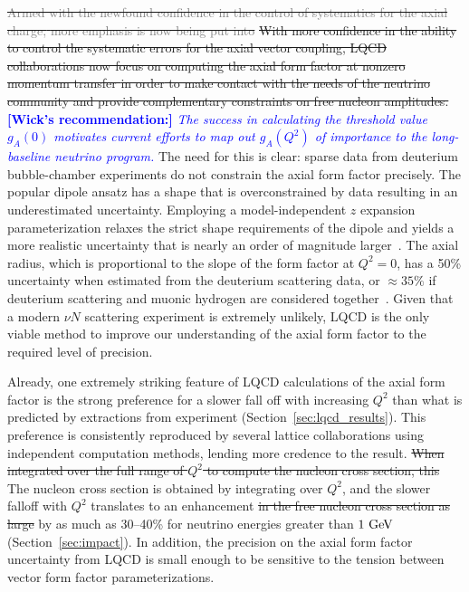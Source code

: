 \documentclass{ar-1col}
\def\asm#1{{\color{blue}#1}}
\def\del#1{}
\def\done#1{{\color{brown}#1}}
\begin{document}
\sout{
 \textcolor{gray}{Armed with the newfound confidence in the control of systematics for the axial charge,}
 \textcolor{gray}{more emphasis is now being put into}}
\sout{
\asm{With more confidence in the ability to control the}
\asm{systematic errors for the axial vector coupling, LQCD collaborations now focus on computing}
 the \done{axial} form factor at nonzero momentum transfer \asm{in order}
 to make contact with the needs of the neutrino community and provide
 complementary constraints on free nucleon amplitudes.
}
{\textcolor{blue}{ {\bf [Wick's recommendation:]}
 \emph{The success in calculating the threshold value $g_A(0)$ motivates current efforts
 to map out $g_A(Q^2)$ of importance to the long-baseline neutrino program.}}}
\asm{The need for this is clear:} \done{sparse data from deuterium bubble-chamber experiments do not constrain
the axial form factor precisely.
The popular dipole ansatz has a shape that
is overconstrained by data resulting in an underestimated uncertainty.
Employing a model-independent $z$ expansion parameterization
relaxes the strict shape requirements of the dipole and yields
a more realistic uncertainty that is nearly an order of magnitude larger~\cite{Meyer:2016oeg}.
The axial radius, which is proportional to the slope of the form factor at $Q^2=0$,
has a 50\% uncertainty when estimated from the deuterium scattering data,
or $\approx35\%$ if deuterium scattering and muonic hydrogen are considered
together~\cite{Hill:2017wgb}.
Given that a modern $\nu N$ scattering experiment is extremely unlikely, LQCD is the only viable method to improve our understanding of the axial form factor to the required level of precision.
}

\done{Already,} one extremely striking feature of LQCD calculations \asm{of the axial form factor}
is the strong preference for a slower fall off \del{of the form factor }with increasing $Q^2$ than \asm{what is predicted by}\del{predicted by phenomenological determinations from} {\color{red} extractions from} experiment (\done{Section~\ref{sec:lqcd_results}}).
This preference is consistently reproduced by several lattice collaborations using
independent computation methods, lending more credence to the result.
\sout{When integrated over the full range of $Q^2$ to compute the nucleon cross section, this}
\asm{The nucleon cross section is obtained by integrating over $Q^2$, and the slower falloff with $Q^2$}
translates to an enhancement \sout{in the free nucleon cross section as large}
\asm{by as much} as 30--40\%
\del{over}\asm{for} neutrino energies greater than $1~{\rm GeV}$ (Section~\ref{sec:impact}).
In addition, the precision on the axial form factor uncertainty from LQCD
is small enough to be sensitive to the tension between vector form factor parameterizations.
\end{document}
